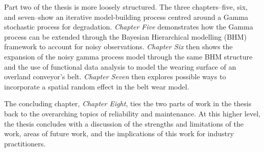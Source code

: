 Part two of the thesis is more loosely structured. The three chapters--five, six, and seven--show an iterative model-building process centred around a Gamma stochastic process for degradation. \textit{Chapter Five} demonstrates how the Gamma process can be extended through the Bayesian Hierarchical modelling (BHM) framework to account for noisy observations. \textit{Chapter Six} then shows the expansion of the noisy gamma process model through the same BHM structure and the use of functional data analysis to model the wearing surface of an overland conveyor's belt. \textit{Chapter Seven} then explores possible ways to incorporate a spatial random effect in the belt wear model.

The concluding chapter, \textit{Chapter Eight}, ties the two parts of work in the thesis back to the overarching topics of reliability and maintenance. At this higher level, the thesis concludes with a discussion of the strengths and limitations of the work, areas of future work, and the implications of this work for industry practitioners.